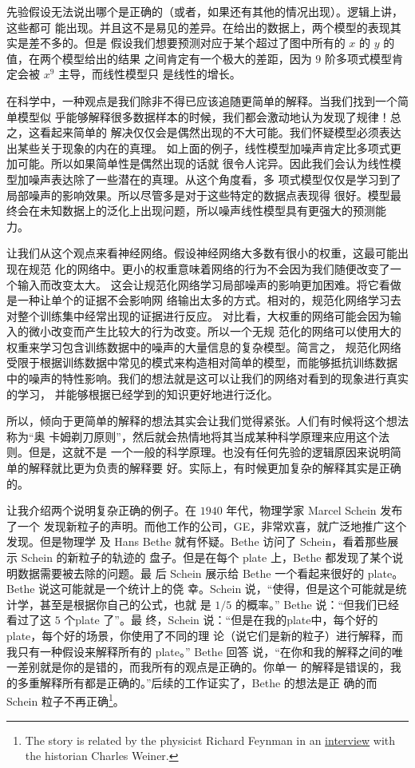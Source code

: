 先验假设无法说出哪个是正确的（或者，如果还有其他的情况出现）。逻辑上讲，这些都可
能出现。并且这不是易见的差异。在给出的数据上，两个模型的表现其实是差不多的。但是
假设我们想要预测对应于某个超过了图中所有的 $x$ 的 $y$ 的值，在两个模型给出的结果
之间肯定有一个极大的差距，因为 $9$ 阶多项式模型肯定会被 $x^9$ 主导，而线性模型只
是线性的增长。

在科学中，一种观点是我们除非不得已应该追随更简单的解释。当我们找到一个简单模型似
乎能够解释很多数据样本的时候，我们都会激动地认为发现了规律！总之，这看起来简单的
解决仅仅会是偶然出现的不大可能。我们怀疑模型必须表达出某些关于现象的内在的真理。
如上面的例子，线性模型加噪声肯定比多项式更加可能。所以如果简单性是偶然出现的话就
很令人诧异。因此我们会认为线性模型加噪声表达除了一些潜在的真理。从这个角度看，多
项式模型仅仅是学习到了局部噪声的影响效果。所以尽管多是对于这些特定的数据点表现得
很好。模型最终会在未知数据上的泛化上出现问题，所以噪声线性模型具有更强大的预测能
力。

让我们从这个观点来看神经网络。假设神经网络大多数有很小的权重，这最可能出现在规范
化的网络中。更小的权重意味着网络的行为不会因为我们随便改变了一个输入而改变太大。
这会让规范化网络学习局部噪声的影响更加困难。将它看做是一种让单个的证据不会影响网
络输出太多的方式。相对的，规范化网络学习去对整个训练集中经常出现的证据进行反应。
对比看，大权重的网络可能会因为输入的微小改变而产生比较大的行为改变。所以一个无规
范化的网络可以使用大的权重来学习包含训练数据中的噪声的大量信息的复杂模型。简言之，
规范化网络受限于根据训练数据中常见的模式来构造相对简单的模型，而能够抵抗训练数据
中的噪声的特性影响。我们的想法就是这可以让我们的网络对看到的现象进行真实的学习，
并能够根据已经学到的知识更好地进行泛化。

所以，倾向于更简单的解释的想法其实会让我们觉得紧张。人们有时候将这个想法称为“奥
卡姆剃刀原则”，然后就会热情地将其当成某种科学原理来应用这个法则。但是，这就不是
一个一般的科学原理。也没有任何先验的逻辑原因来说明简单的解释就比更为负责的解释要
好。实际上，有时候更加复杂的解释其实是正确的。

让我介绍两个说明复杂正确的例子。在 $1940$ 年代，物理学家 Marcel Schein 发布了一个
发现新粒子的声明。而他工作的公司，GE，非常欢喜，就广泛地推广这个发现。但是物理学
及 Hans Bethe 就有怀疑。Bethe 访问了 Schein，看着那些展示 Schein 的新粒子的轨迹的
盘子。但是在每个 plate 上，Bethe 都发现了某个说明数据需要被去除的问题。最
后 Schein 展示给 Bethe 一个看起来很好的 plate。Bethe 说这可能就是一个统计上的侥
幸。Schein 说，“使得，但是这个可能就是统计学，甚至是根据你自己的公式，也就
是 $1/5$ 的概率。” Bethe 说：“但我们已经看过了这 $5$ 个plate 了”。最
终，Schein 说：“但是在我的plate中，每个好的plate，每个好的场景，你使用了不同的理
论（说它们是新的粒子）进行解释，而我只有一种假设来解释所有的 plate。” Bethe 回答
说，“在你和我的解释之间的唯一差别就是你的是错的，而我所有的观点是正确的。你单一
的解释是错误的，我的多重解释所有都是正确的。”后续的工作证实了，Bethe 的想法是正
确的而 Schein 粒子不再正确\footnote{The story is related by the physicist
  Richard Feynman in an
  \href{https://www.aip.org/history-programs/niels-bohr-library/oral-histories/5020-4}{interview}
  with the historian Charles Weiner.}。

